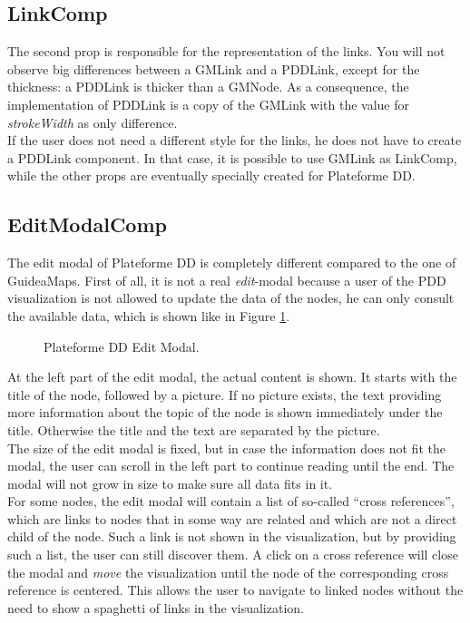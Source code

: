 \subsection{LinkComp}\label{sec:usecase-linkcomp}
The second prop is responsible for the representation of the links. You will not observe big differences between a GMLink and a PDDLink, except for the thickness: a PDDLink is thicker than a GMNode. As a consequence, the implementation of PDDLink is a copy of the GMLink with the value for \textit{strokeWidth} as only difference. \\

If the user does not need a different style for the links, he does not have to create a PDDLink component. In that case, it is possible to use GMLink as LinkComp, while the other props are eventually specially created for Plateforme DD.



\subsection{EditModalComp}\label{sec:usecase-editmodalcomp}
The edit modal of Plateforme DD is completely different compared to the one of GuideaMaps. First of all, it is not a real \textit{edit}-modal because a user of the PDD visualization is not allowed to update the data of the nodes, he can only consult the available data, which is shown like in Figure \ref{fig:pdd-editmodal}.

\begin{figure}[H]
	\centering
	\caption{Plateforme DD Edit Modal.}
	\label{fig:pdd-editmodal}
\end{figure}

At the left part of the edit modal, the actual content is shown. It starts with the title of the node, followed by a picture. If no picture exists, the text providing more information about the topic of the node is shown immediately under the title. Otherwise the title and the text are separated by the picture.\\

The size of the edit modal is fixed, but in case the information does not fit the modal, the user can scroll in the left part to continue reading until the end. The modal will not grow in size to make sure all data fits in it.\\

For some nodes, the edit modal will contain a list of so-called ``cross references'', which are links to nodes that in some way are related and which are not a direct child of the node. Such a link is not shown in the visualization, but by providing such a list, the user can still discover them. A click on a cross reference will close the modal and \textit{move} the visualization until the node of the corresponding cross reference is centered. This allows the user to navigate to linked nodes without the need to show a spaghetti of links in the visualization.



